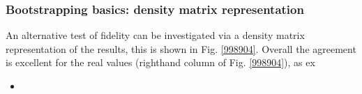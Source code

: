 \subsubsection{Bootstrapping basics: density matrix representation}

An alternative test of fidelity can be investigated via a density matrix representation of the results, this is shown in Fig. \ref{998904}. Overall the agreement is excellent for the real values (righthand column of Fig. \ref{998904}), as ex

\begin{itemize}
\item 
\end{itemize}